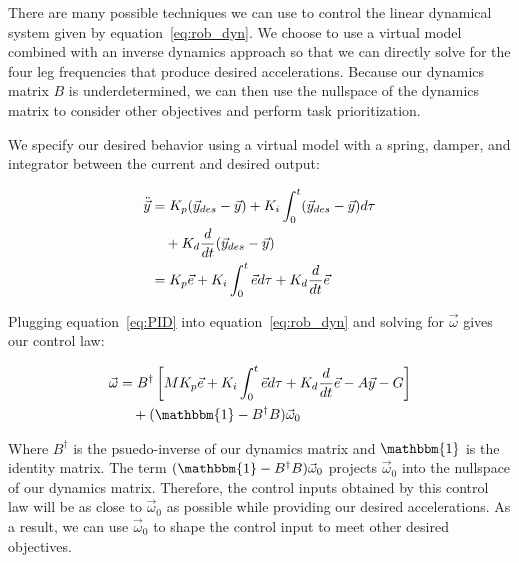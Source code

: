 There are many possible techniques we can use to control the linear dynamical system given by equation~\ref{eq:rob_dyn}. We choose to use a virtual model combined with an inverse dynamics approach so that we can directly solve for the four leg frequencies that produce desired accelerations. Because our dynamics matrix $B$ is underdetermined, we can then use the nullspace of the dynamics matrix to consider other objectives and perform task prioritization.

We specify our desired behavior using a virtual model with a spring, damper, and integrator between the current and desired output:

\begin{align}
    \ddot{\vec{y}} &= K_p (\vec{y}_{des} - \vec{y}) + K_i \int_0^t (\vec{y}_{des} - \vec{y}) d\tau \notag \\
                         &\quad + K_d \frac{d}{dt} (\vec{y}_{des} - \vec{y}) \notag \\
                         &= K_p \vec{e} + K_i \int_0^t \vec{e} d \tau + K_d \frac{d}{dt} \vec{e} \label{eq:PID}
\end{align}

Plugging equation~\ref{eq:PID} into equation~\ref{eq:rob_dyn} and solving for $\vec{\omega}$ gives our control law:

\begin{align}
    \vec{\omega} &= B^{\dagger} \left[ M K_p \vec{e} + K_i \int_0^t \vec{e} d \tau + K_d \frac{d}{dt} \vec{e} - A \vec{y} - G \right] \notag \\
                 &\quad + (\mathbbm{1} - B^{\dagger} B) \vec{\omega}_0 \label{eq:control}
\end{align}

\noindent Where $B^{\dagger}$ is the psuedo-inverse of our dynamics matrix and $\mathbbm{1}$ is the identity matrix. The term $(\mathbbm{1} - B^{\dagger} B) \vec{\omega}_0$ projects $\vec{\omega}_0$ into the nullspace of our dynamics matrix. Therefore, the control inputs obtained by this control law will be as close to $\vec{\omega}_0$ as possible while providing our desired accelerations. As a result, we can use $\vec{\omega}_0$ to shape the control input to meet other desired objectives.

